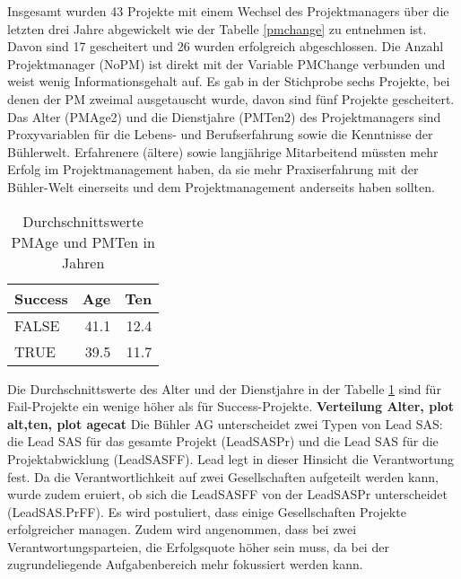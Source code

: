Insgesamt wurden 43 Projekte mit einem Wechsel des Projektmanagers über die letzten drei Jahre abgewickelt wie der Tabelle \ref{pmchange} zu entnehmen ist. Davon sind 17 gescheitert und 26 wurden erfolgreich abgeschlossen. Die Anzahl Projektmanager (NoPM) ist direkt mit der Variable PMChange verbunden und weist wenig Informationsgehalt auf. Es gab in der Stichprobe sechs Projekte, bei denen der PM zweimal ausgetauscht wurde, davon sind fünf Projekte gescheitert.
%
%
\newline Das Alter (PMAge2) und die Dienstjahre (PMTen2) des Projektmanagers sind Proxyvariablen für die Lebens- und Berufserfahrung sowie die Kenntnisse der Bühlerwelt. Erfahrenere (ältere) sowie langjährige Mitarbeitend müssten mehr Erfolg im Projektmanagement haben, da sie mehr Praxiserfahrung mit der Bühler-Welt einerseits und dem Projektmanagement anderseits haben sollten. 
\begin{table}[H]
	\centering
	\caption{Durchschnittswerte PMAge und PMTen in Jahren}
	\begin{tabular}{lrr}
		\textbf{Success} & \multicolumn{1}{l}{\textbf{Age}} & \multicolumn{1}{l}{\textbf{Ten}} \\\hline
		FALSE & 41.1 & 12.4 \\
		TRUE  & 39.5 & 11.7 \\
	\end{tabular}%
	\label{ageten}%
\end{table}%
Die Durchschnittswerte des Alter und der Dienstjahre in der Tabelle \ref{ageten} sind für Fail-Projekte ein wenige höher als für Success-Projekte. \textbf{Verteilung Alter, plot alt,ten, plot agecat}
\newline\newline
%
%
Die Bühler AG unterscheidet zwei Typen von Lead SAS: die Lead SAS für das gesamte Projekt (LeadSASPr) und die Lead SAS für die Projektabwicklung (LeadSASFF). Lead legt in dieser Hinsicht die Verantwortung fest. Da die Verantwortlichkeit auf zwei Gesellschaften aufgeteilt werden kann, wurde zudem eruiert, ob sich die LeadSASFF von der LeadSASPr unterscheidet (LeadSAS.PrFF). Es wird postuliert, dass einige Gesellschaften Projekte erfolgreicher managen. Zudem wird angenommen, dass bei zwei Verantwortungsparteien, die Erfolgsquote höher sein muss, da bei der zugrundeliegende Aufgabenbereich mehr fokussiert werden kann.
